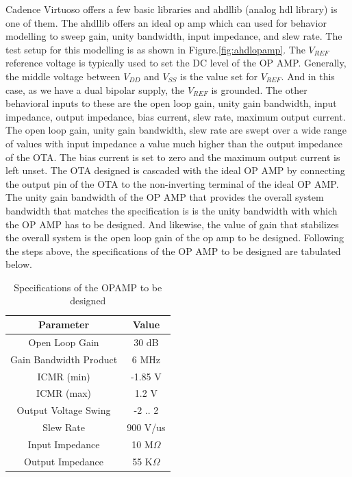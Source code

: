 Cadence Virtuoso offers a few basic libraries and ahdllib (analog hdl library) is one of them. The ahdllib offers an ideal op amp which can used for behavior modelling to sweep gain, unity bandwidth, input impedance, and slew rate. The test setup for this modelling is as shown in Figure.\ref{fig:ahdlopamp}. The $V_{REF}$ reference voltage is typically used to set the DC level of the OP AMP. Generally, the middle voltage between $V_{DD}$ and $V_{SS}$ is the value set for $V_{REF}$. And in this case, as we have a dual bipolar supply, the $V_{REF}$ is grounded. The other behavioral inputs to these are the open loop gain, unity gain bandwidth, input impedance, output impedance, bias current, slew rate, maximum output current. The open loop gain, unity gain bandwidth, slew rate are swept over a wide range of values with input impedance a value much higher than the output impedance of the OTA. The bias current is set to zero and the maximum output current is left unset. The OTA designed is cascaded with the ideal OP AMP by connecting the output pin of the OTA to the non-inverting terminal of the ideal OP AMP. The unity gain bandwidth of the OP AMP that provides the overall system bandwidth that matches the specification is is the unity bandwidth with which the OP AMP has to be designed. And likewise, the value of gain that stabilizes the overall system is the open loop gain of the op amp to be designed. Following the steps above, the specifications of the OP AMP to be designed are tabulated  below.

\begin{table} [H]
\centering
\begin{tabular}{@{}cc@{}}
\toprule
Parameter					& Value				\\ \midrule
Open Loop Gain				& 30 dB				\\
Gain Bandwidth Product		& 6 MHz				\\
ICMR (min)					& -1.85 V			\\
ICMR (max)					& 1.2 V				\\
Output Voltage Swing		& -2 .. 2 			\\
Slew Rate					& 900 V/us			\\
Input Impedance				& 10 M$\Omega$		\\
Output Impedance			& 55 K$\Omega$		\\
\bottomrule
\end{tabular}
\caption{Specifications of the OPAMP to be designed}
\label{tab:OPAMP_Specs}
\end{table}

